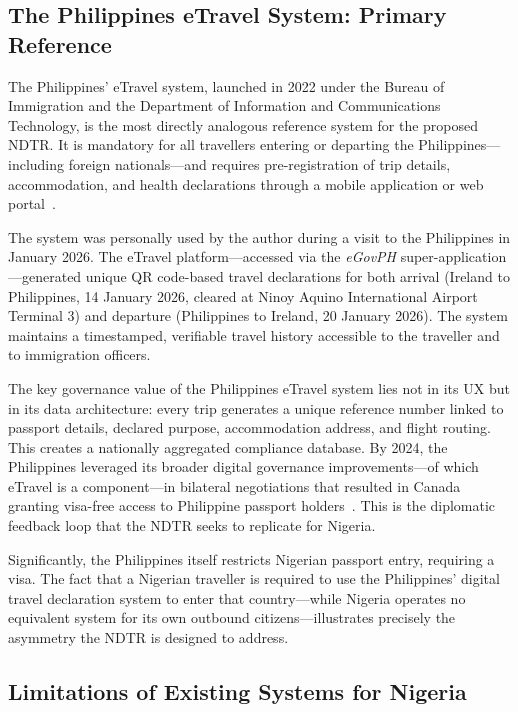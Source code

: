 \documentclass[11pt]{article}
\begin{document}
\subsection{The Philippines eTravel System: Primary Reference}

The Philippines' eTravel system, launched in 2022 under the Bureau of
Immigration and the Department of Information and Communications
Technology, is the most directly analogous reference system for the
proposed NDTR. It is mandatory for all travellers entering or departing
the Philippines---including foreign nationals---and requires
pre-registration of trip details, accommodation, and health declarations
through a mobile application or web portal~\cite{philippinesetravel2022}.

The system was personally used by the author during a visit to the Philippines in
January 2026. The eTravel platform---accessed via the \textit{eGovPH}
super-application---generated unique QR code-based travel declarations
for both arrival (Ireland to Philippines, 14 January 2026, cleared at
Ninoy Aquino International Airport Terminal 3) and departure
(Philippines to Ireland, 20 January 2026). The system maintains a
timestamped, verifiable travel history accessible to the traveller and
to immigration officers.

The key governance value of the Philippines eTravel system lies not in
its UX but in its data architecture: every trip generates a unique
reference number linked to passport details, declared purpose,
accommodation address, and flight routing. This creates a nationally
aggregated compliance database. By 2024, the Philippines leveraged its
broader digital governance improvements---of which eTravel is a
component---in bilateral negotiations that resulted in Canada granting
visa-free access to Philippine passport holders~\cite{canada2024ph}.
This is the diplomatic feedback loop that the NDTR seeks to replicate
for Nigeria.

Significantly, the Philippines itself restricts Nigerian passport entry,
requiring a visa. The fact that a Nigerian traveller is required to
use the Philippines' digital travel declaration system to enter that
country---while Nigeria operates no equivalent system for its own
outbound citizens---illustrates precisely the asymmetry the NDTR is
designed to address.

\subsection{Limitations of Existing Systems for Nigeria}
\end{document}

